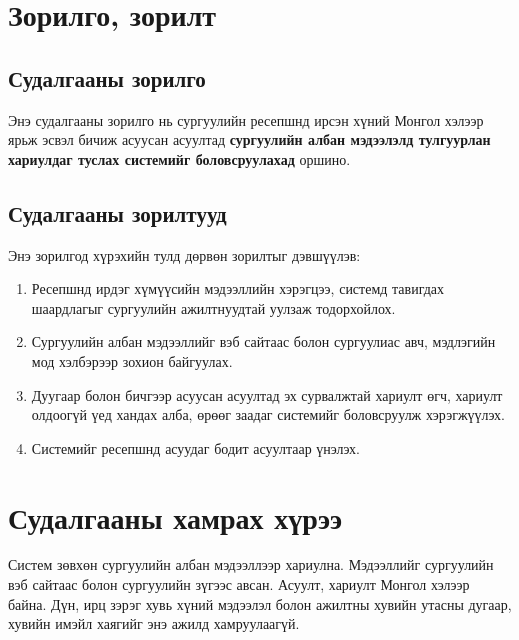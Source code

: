\section{Зорилго, зорилт}
\label{sec:intro-goals}

\subsection{Судалгааны зорилго}

Энэ судалгааны зорилго нь сургуулийн ресепшнд ирсэн хүний Монгол хэлээр ярьж эсвэл бичиж асуусан асуултад \textbf{сургуулийн албан мэдээлэлд тулгуурлан хариулдаг туслах системийг боловсруулахад} оршино.

\subsection{Судалгааны зорилтууд}

Энэ зорилгод хүрэхийн тулд дөрвөн зорилтыг дэвшүүлэв:
\begin{enumerate}
    \item Ресепшнд ирдэг хүмүүсийн мэдээллийн хэрэгцээ, системд тавигдах шаардлагыг сургуулийн ажилтнуудтай уулзаж тодорхойлох.
    \item Сургуулийн албан мэдээллийг вэб сайтаас болон сургуулиас авч, мэдлэгийн мод хэлбэрээр зохион байгуулах.
    \item Дуугаар болон бичгээр асуусан асуултад эх сурвалжтай хариулт өгч, хариулт олдоогүй үед хандах алба, өрөөг заадаг системийг боловсруулж хэрэгжүүлэх.
    \item Системийг ресепшнд асуудаг бодит асуултаар үнэлэх.
\end{enumerate}


\section{Судалгааны хамрах хүрээ}
\label{sec:intro-scope}

Систем зөвхөн сургуулийн албан мэдээллээр хариулна. Мэдээллийг сургуулийн вэб сайтаас болон сургуулийн зүгээс авсан. Асуулт, хариулт Монгол хэлээр байна. Дүн, ирц зэрэг хувь хүний мэдээлэл болон ажилтны хувийн утасны дугаар, хувийн имэйл хаягийг энэ ажилд хамруулаагүй.

